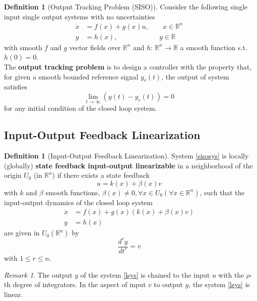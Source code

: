 \documentclass[11pt, a4paper, oneside, openany, reqno]{book}
\theoremstyle{definition}
\newtheorem{definition}[theorem]{Definition}
\theoremstyle{remark}
\newtheorem{remark}[theorem]{Remark}
\numberwithin{equation}{chapter} %
\newcommand{\R}{\ensuremath{{\mathbb R}}}
\begin{document}
\begin{definition}[Output Tracking Problem (SISO)]
	Consider the following single input single output systems with no uncertainties
	\begin{equation}\begin{split}\label{sisosys}
	\dot{x}&=f(x)+g(x)u,  \qquad x \in \R^n \\
	y&=h(x), \qquad\qquad\qquad y \in \R 
	\end{split}\end{equation} 
	with smooth $ f $ and $ g $ vector fields over $\R^n$ and $ h $: $\R^n \rightarrow \R$ 
	a smooth function s.t. $ h(0)=0 $.\\
	The \textbf{output tracking problem} is to design a controller with the property that,
	for given a smooth bounded reference signal $ y_r(t) $, the output of system satisfies 
	\[ \lim_{t \to \infty}(y(t)-y_r(t)) = 0 \]
	for any initial condition of the closed loop system.
\end{definition}

\subsection{Input-Output Feedback Linearization}

\begin{definition}[Input-Output Feedback Linearization]
	System \eqref{sisosys} is locally (globally) \textbf{state feedback input-output linearizable} 
	in a neighborhood of the origin $ U_0 $ (in $ \R^n $) if there exists a state feedback
	\begin{equation}
	u=k(x)+\beta(x)v
	\end{equation}
	with $k$ and $\beta$ smooth functions, 
	$\beta(x)\neq0, \forall x \in U_0 ( \forall x \in \R^n) $,
	such that the input-output dynamics of the closed loop system
	\begin{equation}\begin{split}\label{lsys}
	\dot{x}&= f(x) +g(x)(k(x)+\beta(x)v) \\
	y&= h(x)
	\end{split}\end{equation} 
	are given in $ U_0 ( \R^n )$ by \[ \frac{d^ry}{dt^r} = v \] with $ 1 \leq r \leq n $.
\end{definition}

\begin{remark}
	The output $ y $ of the system \eqref{lsys} is chained 
	to the input $ u $ with the $\rho$-th degree of integrators. 
	In the aspect of input $ v $ to output $ y  $, the system \eqref{lsys} is linear.
\end{remark}
\end{document}
